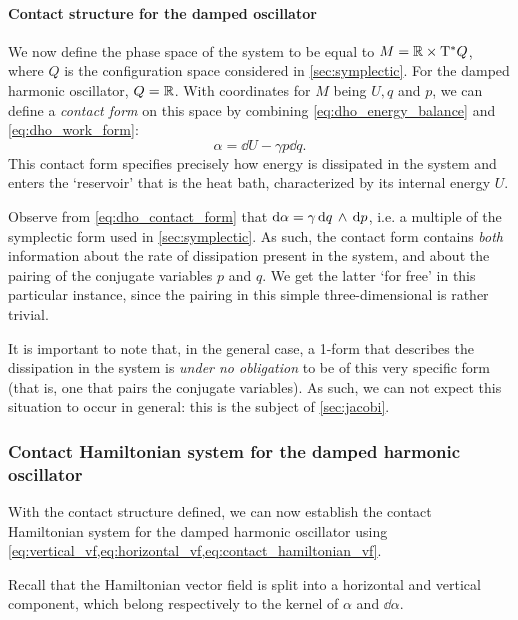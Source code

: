 \paragraph{Contact structure for the damped oscillator} We now define the phase space of the system to be equal to \(M = \mathbb{R} \times \mathrm{T}^*Q\), where \(Q\) is the configuration space considered in \cref{sec:symplectic}. For the damped harmonic oscillator, \(Q = \mathbb{R}\). With coordinates for \(M\) being \(U, q\) and \(p\), we can define a \emph{contact form} on this space by combining \cref{eq:dho_energy_balance} and \cref{eq:dho_work_form}: 
\begin{equation}
    \alpha = \dd{U} - \gamma p \dd{q}.
    \label{eq:dho_contact_form}
\end{equation}
This contact form specifies precisely how energy is dissipated in the system and enters the `reservoir' that is the heat bath, characterized by its internal energy \(U\).

Observe from \cref{eq:dho_contact_form} that \(\dd{\alpha} = \gamma  \dd{q}\,\wedge\,\dd{p} \), i.e. a multiple of the symplectic form used in \cref{sec:symplectic}. As such, the contact form contains \emph{both} information about the rate of dissipation present in the system, and about the pairing of the conjugate variables \(p\) and \(q\). We get the latter `for free' in this particular instance, since the pairing in this simple three-dimensional is rather trivial.

It is important to note that, in the general case, a 1-form that describes the dissipation in the system is \emph{under no obligation} to be of this very specific form (that is, one that pairs the conjugate variables). As such, we can not expect this situation to occur in general: this is the subject of \cref{sec:jacobi}.

\subsubsection{Contact Hamiltonian system for the damped harmonic oscillator}
With the contact structure defined, we can now establish the contact Hamiltonian system for the damped harmonic oscillator using \cref{eq:vertical_vf,eq:horizontal_vf,eq:contact_hamiltonian_vf}.

Recall that the Hamiltonian vector field is split into a horizontal and vertical component, which belong respectively to the kernel of \(\alpha\) and \(\dd{\alpha}\).

